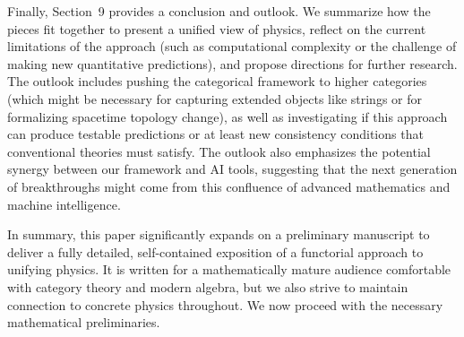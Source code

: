 \vspace{0.5cm}

Finally, Section~9 provides a conclusion and outlook. We summarize how the pieces fit together to present a unified view of physics, reflect on the current limitations of the approach (such as computational complexity or the challenge of making new quantitative predictions), and propose directions for further research. The outlook includes pushing the categorical framework to higher categories (which might be necessary for capturing extended objects like strings or for formalizing spacetime topology change), as well as investigating if this approach can produce testable predictions or at least new consistency conditions that conventional theories must satisfy. The outlook also emphasizes the potential synergy between our framework and AI tools, suggesting that the next generation of breakthroughs might come from this confluence of advanced mathematics and machine intelligence.

\vspace{0.5cm}

In summary, this paper significantly expands on a preliminary manuscript to deliver a fully detailed, self-contained exposition of a functorial approach to unifying physics. It is written for a mathematically mature audience comfortable with category theory and modern algebra, but we also strive to maintain connection to concrete physics throughout. We now proceed with the necessary mathematical preliminaries.